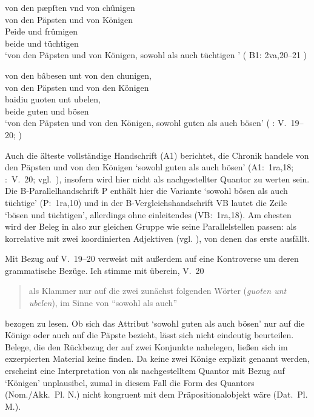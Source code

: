 \begin{exe}
\ex \begin{xlist}
	\ex \label{ex:kcexcl1}
		\gll von den pæpſten vnd von chûnigen \\
			von den Päpsten und von Königen \\
	\sn \gll Peide und frûmigen \\
			beide und tüchtigen \\
		\trans `von den Päpsten und von Königen, sowohl als auch tüchtigen
			'
			(%
				B1: 2va,20--21%
			)

	\ex \label{ex:kcexcl1_schroeder}
		\gll von den bâbesen unt von den chunigen, \\
			von den Päpsten und von den Königen \\
	\sn \gll baidiu guoten unt ubelen, \\
			beide guten und bösen \\
		\trans `von den Päpsten und von den Königen, sowohl guten als auch
			bösen'
			(%
				\KC: V.~19--20;
				\cite[79]{schroeder1895}%
			)
\end{xlist}
\end{exe}

Auch die älteste vollständige Handschrift (A1) berichtet, die Chronik handele
von den Päpsten und von den Königen  `sowohl guten
als auch bösen' (A1:~1ra,18; \KC:~V.~20; vgl.~\cite[79]{schroeder1895}),
insofern wird  hier nicht als nachgestellter Quantor zu werten
sein. Die B-\allowbreak{}Pa\-ral\-lel\-hand\-schrift P enthält hier die
Variante  `sowohl bösen als auch
tüchtige' (P:~1ra,10) und in der B-Vergleichshandschrift VB lautet
die Zeile  `bösen und tüchtigen', allerdings ohne
einleitendes  (VB:~1ra,18). Am ehesten wird der Beleg in
 also zur gleichen Gruppe wie seine
Parallelstellen passen:  als korrelative
 mit zwei koordinierten
Adjektiven (vgl. ), von
denen das erste ausfällt.

Mit Bezug auf V.~19--20 verweist \citet[26, Fußnote 45]{weis2022} mit
\citet[55, Fußnote 87]{dickhutbielsky2015} außerdem auf eine Kontroverse um
deren grammatische Bezüge. Ich stimme mit \citet[239]{haupt2019} überein, V.~20
\blockquote{als Klammer nur auf die zwei zunächst folgenden Wörter
(\textit{guoten unt ubelen}), im Sinne von \enquote{sowohl als auch}} bezogen
zu lesen. Ob sich das Attribut 
`sowohl guten als auch bösen' nur auf die Könige oder auch auf die Päpste
bezieht, lässt sich nicht eindeutig beurteilen. Belege, die den
Rückbezug der   auf zwei Konjunkte nahelegen,
ließen sich im exzerpierten Material keine finden. Da keine zwei Könige
explizit genannt werden, erscheint eine Interpretation von  als
nachgestelltem Quantor mit Bezug auf  `Königen' unplausibel,
zumal in diesem Fall die Form des Quantors (Nom./Akk.~Pl. N.) nicht kongruent
mit dem Präpositionalobjekt wäre (Dat.~Pl. M.).

